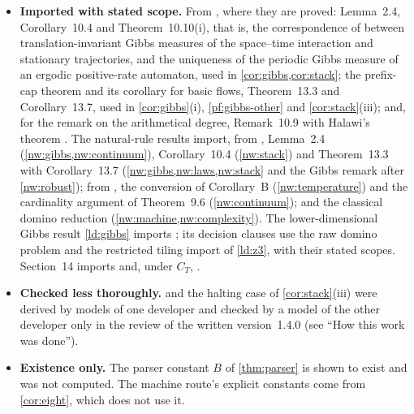 \begin{itemize}
\item \textbf{Imported with stated scope.} From \cite{DM26}, where they are proved: Lemma~2.4, Corollary~10.4 and Theorem~10.10(i), that is, the correspondence of \cite{GKLM89} between translation-invariant Gibbs measures of the space--time interaction and stationary trajectories, and the uniqueness of the periodic Gibbs measure of an ergodic positive-rate automaton, used in \cref{cor:gibbs,cor:stack}; the prefix-cap theorem and its corollary for basic flows, Theorem~13.3 and Corollary~13.7, used in \cref{cor:gibbs}(i), \cref{pf:gibbs-other} and \cref{cor:stack}(iii); and, for the remark on the arithmetical degree, Remark~10.9 with Halawi's theorem \cite{Halawi22}. The natural-rule results import, from \cite{DM26}, Lemma~2.4 (\cref{nw:gibbs,nw:continuum}), Corollary~10.4 (\cref{nw:stack}) and Theorem~13.3 with Corollary~13.7 (\cref{nw:gibbs,nw:laws,nw:stack} and the Gibbs remark after \cref{nw:robust}); from \cite{DMdiagram}, the conversion of Corollary~B (\cref{nw:temperature}) and the cardinality argument of Theorem~9.6 (\cref{nw:continuum}); and the classical domino reduction \cite{Berger66,Robinson71} (\cref{nw:machine,nw:complexity}). The lower-dimensional Gibbs result \cref{ld:gibbs} imports \cite[Corollary~13.7, equations~(7)--(8), Theorem~13.3 and Lemma~2.4]{DM26}; its decision clauses use the raw domino problem and the restricted tiling import of \cref{ld:z3}, with their stated scopes. Section~14 imports \cite[Lemma~2.4, Theorem~10.3 and Corollary~10.4]{DM26} and, under $C_T$, \cite[Lemma~25, Corollary~26 and Lemmas~27--29]{Torma15}.
\item \textbf{Checked less thoroughly.}  and the halting case of \cref{cor:stack}(iii) were derived by models of one developer and checked by a model of the other developer only in the review of the written version~1.4.0 (see ``How this work was done'').
\item \textbf{Existence only.} The parser constant $B$ of \cref{thm:parser} is shown to exist and was not computed. The machine route's explicit constants come from \cref{cor:eight}, which does not use it.

\end{itemize}
